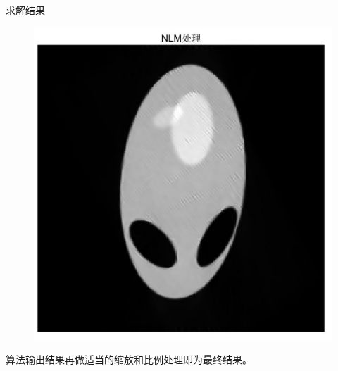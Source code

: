 \documentclass{beamer} %
\begin{document}
\begin{frame}{求解结果}
\begin{figure}[H]
\begin{minipage}[H]{0.4\textwidth}
		\includegraphics[width=\textwidth]{./pic/P2-ART-5-NLM.jpg}
		\end{minipage}
	\end{figure}
	算法输出结果再做适当的缩放和比例处理即为最终结果。 
\end{frame}
\end{document}
